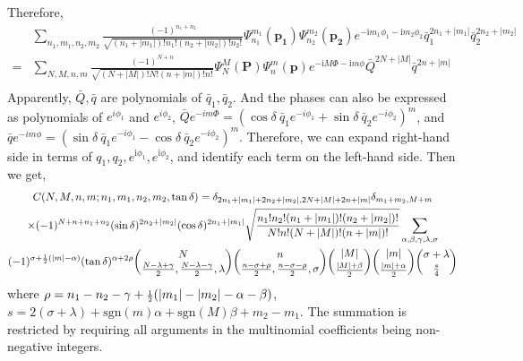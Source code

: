 \documentclass[a4paper,10pt]{article}
\newcommand{\half}[1][1] {\mathsmaller{\frac{#1}{2}}}
\newcommand{\imag} {\text{i}} %
\begin{document}
% 
Therefore,
\[
\begin{split}
& \sum_{n_1,m_1,n_2,m_2} \frac{(-1)^{n_1+n_2}}{\sqrt{(n_1+|m_1|)!n_1! (n_2+|m_2|)!n_2!}} 
\Psi_{n_1}^{m_1}(\bm{p_1}) \Psi_{n_2}^{m_2} (\bm{p_2}) e^{-\imag m_1\phi_1-\imag m_2 \phi_2}
\bar q_1^{2n_1+|m_1|} \bar q_2^{2n_2+|m_2|}	\\
=&\sum_{N,M,n,m} \frac{(-1)^{N+n}}{\sqrt{(N+|M|)!N! (n+|m|)!n!}} 
\Psi_N^M(\bm{P})\Psi_n^m(\bm{p}) e^{-\imag M \Phi - \imag m \phi} \bar Q^{2N+|M|} \bar q^{2n+|m|}	\\
%
\end{split}
\]
Apparently, $\bar Q, \bar q$ are polynomials of $\bar q_1,\bar q_2$. 
And the phases can also be expressed as polynomials of $e^{i\phi_1}$ and
$e^{i\phi_2}$,
$\bar Q e^{-im\Phi}= (\cos\delta~\bar q_1 e^{-i\phi_1} +
 \sin\delta~\bar q_2 e^{-i\phi_2})^m$, and 
$\bar q e^{-im\phi} = (\sin\delta~\bar q_1 e^{-i\phi_1} -
 \cos\delta~\bar q_2 e^{-i\phi_2})^m$.  
Therefore, we can expand right-hand side in terms of $q_1, q_2, e^{\imag\phi_1}, e^{\imag\phi_2}$, 
and identify each term on the left-hand side. Then we get, 
\begin{multline}
%  
C(N,M,n,m;n_1,m_1,n_2,m_2,\tan\delta) = 
\delta_{2n_1+|m_1|+2n_2+|m_2|,2N+|M|+2n+|m|} \delta_{m_1+m_2,M+m} \\
\times (-1)^{N+n+n_1+n_2} (\sin\delta)^{2n_2+|m_2|} (\cos\delta)^{2n_1+|m_1|} 
\sqrt{\frac{n_1!n_2!(n_1+|m_1|)!(n_2+|m_2|)!}{N!n!(N+|M|)!(n+|m|)!}} 
 \sum_{\alpha,\beta,\gamma,\lambda,\sigma} \\
(-1)^{\sigma+\half(|m|-\alpha)} 
(\tan\delta)^{\alpha+2\rho} 
{N \choose \frac{N-\lambda+\gamma}{2}, \frac{N-\lambda-\gamma}{2},\lambda}
{n \choose \frac{n-\sigma+\rho}{2}, \frac{n-\sigma-\rho}{2}, \sigma}
 {|M| \choose \frac{|M|+\beta}{2}} 
{ |m| \choose \frac{|m|+\alpha}{2} } 
 {\sigma+\lambda \choose \frac{s}{4} }
% 
\end{multline}
where $\rho = n_1-n_2-\gamma+\half(|m_1|-|m_2|-\alpha-\beta)$, 
$s = 2(\sigma+\lambda)+\mathrm{sgn}(m)\alpha+\mathrm{sgn}(M)\beta+m_2-m_1$. The summation is restricted by 
requiring all arguments in the multinomial coefficients being non-negative integers.
\end{document}

